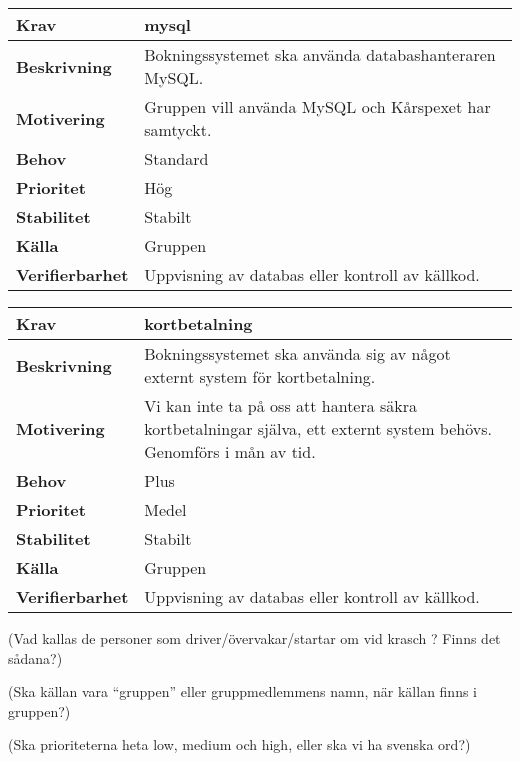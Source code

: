 \documentclass[a4paper, twoside, 11pt, titlepage]{article}
\begin{document}
		\begin{tabular} { | p{3cm} | p{12.2cm} | }
			\hline
			\textbf{Krav} & mysql  \\
			\hline
			\textbf{Beskrivning} & Bokningssystemet ska använda databashanteraren MySQL.  \\
			\hline
			\textbf{Motivering} & Gruppen vill använda MySQL och Kårspexet har samtyckt.  \\
			\hline
			\textbf{Behov} & Standard  \\
			\hline
			\textbf{Prioritet} & Hög  \\
			\hline
			\textbf{Stabilitet} & Stabilt  \\
			\hline
			\textbf{Källa} & Gruppen  \\
			\hline
			\textbf{Verifierbarhet} & Uppvisning av databas eller kontroll av källkod.  \\
			\hline
		\end{tabular}

		\begin{tabular} { | p{3cm} | p{12.2cm} | }
			\hline
			\textbf{Krav} & kortbetalning  \\
			\hline
			\textbf{Beskrivning} & Bokningssystemet ska använda sig av något externt system för kortbetalning.  \\
			\hline
			\textbf{Motivering} & Vi kan inte ta på oss att hantera säkra kortbetalningar själva, ett externt system behövs. Genomförs i mån av tid.  \\
			\hline
			\textbf{Behov} & Plus  \\
			\hline
			\textbf{Prioritet} & Medel  \\
			\hline
			\textbf{Stabilitet} & Stabilt  \\
			\hline
			\textbf{Källa} & Gruppen  \\
			\hline
			\textbf{Verifierbarhet} & Uppvisning av databas eller kontroll av källkod.  \\
			\hline
		\end{tabular}

		(Vad kallas de personer som driver/övervakar/startar om vid krasch ? Finns det sådana?)

		(Ska källan vara ``gruppen'' eller gruppmedlemmens namn, när källan finns i gruppen?)

		(Ska prioriteterna heta low, medium och high, eller ska vi ha svenska ord?)
\end{document}
